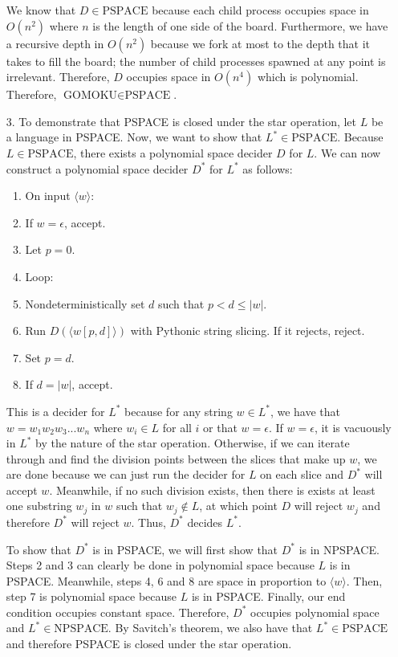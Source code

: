 \documentclass[11pt, reqno]{amsart}
\theoremstyle{plain}
\theoremstyle{definition}
\newcounter{r}
\def\tab{\hspace{10pt}}
\begin{document}
\begin{enumerate}
    We know that $D\in\text{PSPACE}$ because each child process occupies space
    in $O(n^2)$ where $n$ is the length of one side of the board. Furthermore,
    we have a recursive depth in $O(n^2)$ because we fork at most to the depth
    that it takes to fill the board; the number of child processes spawned at
    any point is irrelevant. Therefore, $D$ occupies space in $O(n^4)$ which is
    polynomial. Therefore, $\text{GOMOKU}\in\text{PSPACE}$.

  \item[3.] To demonstrate that PSPACE is closed under the star operation, let
    $L$ be a language in PSPACE. Now, we want to show that
    $L^*\in\text{PSPACE}$. Because $L\in\text{PSPACE}$, there exists a
    polynomial space decider $D$ for $L$. We can now construct a polynomial
    space decider $D^*$ for $L^*$ as follows:
    \begin{enumerate}[1.]
      \item On input $\langle w\rangle$:
      \item \tab If $w = \epsilon$, accept.
      \item \tab Let $p = 0$.
      \item \tab Loop:
      \item \tab\tab Nondeterministically set $d$ such that $p < d \leq |w|$.
      \item \tab\tab Run $D(\langle w[p, d]\rangle)$ with Pythonic string
        slicing. If it rejects, reject.
      \item \tab\tab Set $p = d$.
      \item \tab\tab If $d = |w|$, accept.
    \end{enumerate}
    This is a decider for $L^*$ because for any string $w\in L^*$, we have that
    $w = w_1w_2w_3...w_n$ where $w_i\in L$ for all $i$ or that $w = \epsilon$.
    If $w = \epsilon$, it is vacuously in $L^*$ by the nature of the star
    operation. Otherwise, if we can iterate through and find the division
    points between the slices that make up $w$, we are done because we can just
    run the decider for $L$ on each slice and $D^*$ will accept $w$. Meanwhile,
    if no such division exists, then there is exists at least one substring
    $w_j$ in $w$ such that $w_j\notin L$, at which point $D$ will reject $w_j$
    and therefore $D^*$ will reject $w$. Thus, $D^*$ decides $L^*$.

    To show that $D^*$ is in PSPACE, we will first show that $D^*$ is in
    NPSPACE. Steps 2 and 3 can clearly be done in polynomial space because $L$
    is in PSPACE. Meanwhile, steps 4, 6 and 8 are space in proportion to
    $\langle w\rangle$. Then, step 7 is polynomial space because $L$ is in
    PSPACE. Finally, our end condition occupies constant space. Therefore,
    $D^*$ occupies polynomial space and $L^*\in\text{NPSPACE}$. By Savitch's
    theorem, we also have that $L^*\in\text{PSPACE}$ and therefore PSPACE is
    closed under the star operation.
\end{enumerate}
\end{document}
